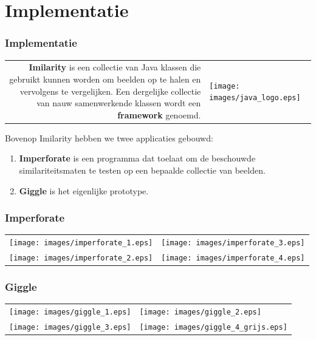 \documentclass[dutch]{beamer}
\theoremstyle{definition}
\theoremstyle{remark}
\theoremstyle{example}
\begin{document}
\section{Implementatie}
\frame
{
  \frametitle{Implementatie}
  
  \begin{center}
  \begin{tabular}{@{}rl@{}}
  \begin{minipage}{0.8\textwidth}
  \raggedright
  \textbf{Imilarity} is een collectie van Java klassen die gebruikt kunnen worden om 
  beelden op te halen en vervolgens te vergelijken. Een dergelijke collectie van nauw 
  samenwerkende klassen wordt een \textbf{framework} genoemd. 
  \end{minipage} &
  \begin{minipage}{0.2\textwidth}
  \centering
  \texttt{[image: images/java\_logo.eps]}
  \end{minipage}
  \end{tabular}
  \end{center}
  
  Bovenop Imilarity hebben we twee applicaties gebouwd:
  \begin{enumerate}
    \item \textbf{Imperforate} is een programma dat toelaat om de beschouwde 
    similariteitsmaten te testen op een bepaalde collectie van beelden.
    \item \textbf{Giggle} is het eigenlijke prototype.
  \end{enumerate}
}
\frame
{
  \frametitle{Imperforate}
  
  \centering
  \begin{tabular}{@{}rl@{}}
  \texttt{[image: images/imperforate\_1.eps]} &
  \texttt{[image: images/imperforate\_3.eps]} \vspace{8pt}\\
  \texttt{[image: images/imperforate\_2.eps]} &
  \texttt{[image: images/imperforate\_4.eps]}
  \end{tabular}
}
\frame
{
  \frametitle{Giggle}
  
  \centering
  \begin{tabular}{@{}rl@{}}
  \texttt{[image: images/giggle\_1.eps]} &
  \texttt{[image: images/giggle\_2.eps]} \vspace{8pt}\\
  \texttt{[image: images/giggle\_3.eps]} &
  \texttt{[image: images/giggle\_4\_grijs.eps]}
  \end{tabular}
}
\frame
\end{document}
